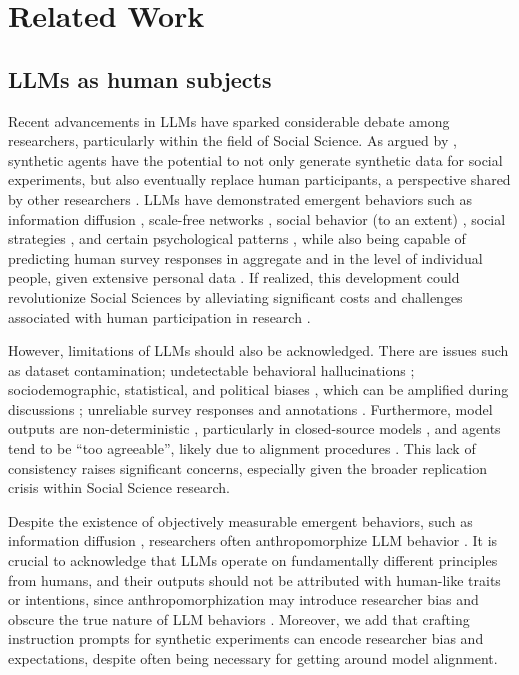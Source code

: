 %
\section{Related Work}

\subsection{LLMs as human subjects}
\label{ssec:related:human-llm}

Recent advancements in \acp{LLM} have sparked considerable debate among researchers, particularly within the field of Social Science. As argued by \citet{grossman_2023}, synthetic agents have the potential to not only generate synthetic data for social experiments, but also eventually replace human participants, a perspective shared by other researchers \cite{tornberg_2023, argyle2023}. \acp{LLM} have demonstrated emergent behaviors such as information diffusion \cite{Park2023GenerativeAI}, scale-free networks \cite{demarzo_2023}, social behavior (to an extent) \cite{leng_2024}, social strategies \cite{abdelnabi_negotiations}, and certain psychological patterns \cite{abramski_2023}, while also being capable of predicting human survey responses in aggregate \cite{hewitt2024predicting} and in the level of individual people, given extensive personal data \cite{park2024generativeagentsimulations1000}. If realized, this development could revolutionize Social Sciences by alleviating significant costs and challenges associated with human participation in research \cite{rossi_2024, shapiro2019polling}.

However, limitations of \acp{LLM} should also be  acknowledged. There are issues such as dataset contamination; undetectable behavioral hallucinations \cite{rossi_2024}; sociodemographic, statistical, and political biases \cite{anthis_2025,hewitt2024predicting,rossi_2024}, which can be amplified during discussions \cite{Taubenfeld2024SystematicBI}; unreliable survey responses \cite{jansen_2023,bisbee_2023,neumann_2025} and annotations \cite{Gligoric2024CanUL}. Furthermore, model outputs are non-deterministic \cite{atil_2025}, particularly in closed-source models \cite{bisbee_2023}, and agents tend to be “too agreeable”, likely due to alignment procedures \cite{Park2023GenerativeAI, anthis_2025, rossi_2024}. This lack of consistency raises significant concerns, especially given the broader replication crisis within Social Science research.

Despite the existence of objectively measurable emergent behaviors, such as information diffusion \cite{Park2023GenerativeAI}, researchers often anthropomorphize \ac{LLM} behavior \cite{rossi_2024}. It is crucial to acknowledge that \acp{LLM} operate on fundamentally different principles from humans, and their outputs should not be attributed with human-like traits or intentions, since anthropomorphization may introduce researcher bias and obscure the true nature of \ac{LLM} behaviors \cite{anthis_2025,zhou-etal-2024-real}. Moreover, we add that crafting instruction prompts for synthetic experiments can encode researcher bias and expectations, despite often being necessary for getting around model alignment.


